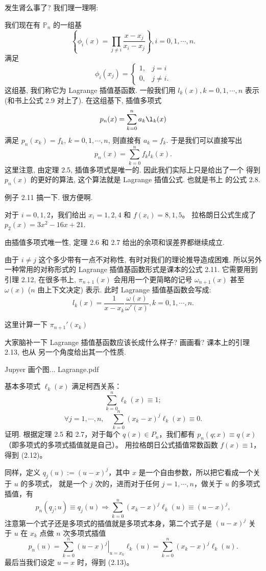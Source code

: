 \documentclass[a4paper]{ctexart}
\begin{document}
发生肾么事了? 我们理一理啊:

我们现在有 $\mathbb{P}_n$ 的一组基
$$
\left\{\phi_i(x) = \prod_{j \neq i}\frac{x - x_j}{x_i - x_j}
\right\}, i = 0, 1, \cdots, n.
$$
满足
$$
\phi_i(x_j) = \left\{
\begin{array}{ll}
  1,& j = i \\
  0,& j \neq i.
\end{array}
\right.
$$
这组基, 我们称它为 Lagrange 插值基函数. 一般我们用 $l_k(x), k = 0, 1, \cdots, n$
表示(和书上公式 2.9 对上了). 在这组基下, 插值多项式
$$
p_n(x) = \sum_{k = 0}^n a_k \l_k(x)
$$
满足 $p_n(x_k) = f_k$, $k = 0, 1, \cdots, n$,
则直接有 $a_k = f_k$. 于是我们可以直接写出
$$
p_n(x) = \sum_{k = 0}^n f_k l_k(x).
$$
这里注意, 由定理 2.5, 插值多项式是唯一的. 因此我们实际上只是给出了一个
得到 $p_n(x)$ 的更好的算法, 这个算法就是 Lagrange 插值公式. 也就是书上
的公式 2.8.

例子 2.11 搞一下. 很方便啊. 

对于 $i = 0, 1, 2$，我们给出 $x_i = 1, 2, 4$ 和 $f (x_i ) = 8, 1, 5$。
拉格朗日公式生成了 $p_2 (x) = 3x^2 - 16x + 21$.

由插值多项式唯一性, 定理 2.6 和 2.7 给出的余项和误差界都继续成立.

由于 $i \neq j$ 这个多少带有一点不对称性, 有时对我们的理论推导造成困难.
所以另外一种常用的对称形式的 Lagrange 插值基函数形式是课本的公式 2.11.
它需要用到引理 2.12, 在很多书上, $\pi_{n + 1}(x)$ 会用用一个更简略的记号
$\omega_{n + 1}(x)$ 甚至 $\omega(x)$ ($n$ 由上下文决定) 表示. 此时
Lagrange 插值基函数会写成:
$$
l_k(x) = \frac{1}{x - x_k}\frac{\omega(x)}{\omega'(x)}, k = 0, 1, \cdots, n.
$$

这里计算一下 $\pi_{n + 1}'(x_k)$

大家脑补一下 Lagrange 插值基函数应该长成什么样子? 画画看? 课本上的引理 2.13, 也从
另一个角度给出其一个性质. 

Jupyer 画个图... Lagrange.pdf

 基本多项式 $\ell_k (x)$ 满足柯西关系：
\[
\sum_{k=0}^{n} \ell_k(x) \equiv 1; \tag{2.12}
\]
\[
\forall j = 1, \cdots , n, \quad \sum_{k=0}^{n} (x_k - x)^j \ell_k (x) \equiv 0. \tag{2.13}
\]
证明. 根据定理 2.5 和 2.7，对于每个 $q(x) \in P_n$，我们都有 $p_n (q; x) \equiv q(x)$（即多项式的多项式插值就是自己）。
用拉格朗日公式插值常数函数 $f (x) \equiv 1$，得到 (2.12)。

同样，定义 $q_j (u) := (u - x)^j$，其中 $x$ 是一个自由参数，所以把它看成一个关于 $u$ 的多项式，
就是一个 $j$ 次的，进而对于任何 $j = 1, \cdots , n$，做关于 $u$ 的多项式插值，有
\[
p_n (q_j ; u) \equiv q_j (u) \Rightarrow \sum_{k=0}^{n} (x_k - x)^j \ell_k (u) \equiv (u - x)^j ,
\]
注意第一个式子还是多项式的插值就是多项式本身，第二个式子是 $(u - x)^j$ 关于 $u$ 在 $x_k$ 点做 
$n$ 次多项式插值
\[
  p_n(u) = \sum_{k=0}^{n} \left.(u - x)^j\right|_{u = x_k} \ell_k (u) = \sum_{k=0}^{n} (x_k - x)^j \ell_k (u).
\]
最后当我们设定 $u = x$ 时，得到 (2.13)。
\end{document}

